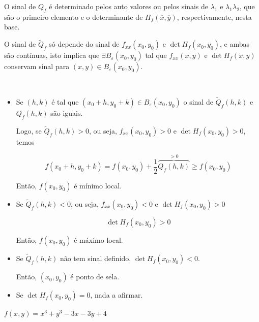 \documentclass[11pt, oneside, a4paper]{gsm-l}
\begin{document}
O sinal de $Q_f$ é determinado pelos auto valores ou pelos sinais de $\lambda_1$ e $\lambda_1\lambda_2$, que são o primeiro elemento e o determinante de $H_f \left( {\overline x ,\overline y } \right)$, respectivamente, nesta base.

O sinal de $\widetilde Q_f$ s\'o depende do sinal de $f_{xx} \left( {x_0 ,y_0 } \right)$ e $\det H_f \left( {x_0 ,y_0 } \right)$, e ambas são contínuas, isto implica que $\exists B_\varepsilon  \left( {x_0 ,y_0 } \right)$ tal que $f_{xx} \left( {x,y} \right)$ e $\det H_f \left( {x,y} \right)$ conservam sinal para $\left( {x,y} \right) \in B_\varepsilon  \left( {x_0 ,y_0 } \right)$.

\

\begin{itemize}
  \item Se $\left( {h,k} \right)$ é tal que $\left( {x_0  + h,y_0  + k} \right) \in B_\varepsilon  \left( {x_0 ,y_0 } \right)$ o sinal de $\widetilde Q_f \left( {h,k} \right)$ e $Q_f \left( {h,k} \right)$ são iguais.

      Logo, se $\widetilde Q_f \left( {h,k} \right) > 0$, ou seja, $f_{xx} \left( {x_0 ,y_0 } \right) > 0$ e $\det H_f \left( {x_0 ,y_0 } \right) > 0$, temos

\[
        f\left( {x_0  + h,y_0  + k} \right) = f\left( {x_0 ,y_0 } \right) + \frac{1}{2}\overbrace {Q_f \left( {h,k} \right)}^{ > 0} \geqslant f\left( {x_0 ,y_0 } \right)
\]

Então, $f\left( {x_0 ,y_0 } \right)$ é mínimo local.

  \item Se $\widetilde Q_f \left( {h,k} \right) < 0$, ou seja, $f_{xx} \left( {x_0 ,y_0 } \right) < 0$ e $\det H_f \left( {x_0 ,y_0 } \right) > 0$

\[
\det H_f \left( {x_0 ,y_0 } \right) > 0
\]

Então, $f\left( {x_0 ,y_0 } \right)$ é máximo local.

  \item Se $\widetilde Q_f \left( {h,k} \right)$ não tem sinal definido, $\det H_f \left( {x_0 ,y_0 } \right) < 0$.

Então, $\left( {x_0 ,y_0 } \right)$ é ponto de sela.
\item Se $\det H_f \left( {x_0 ,y_0 } \right) = 0$, nada a afirmar.
\end{itemize}

\begin{exem}
$f\left( {x,y} \right) = x^3  + y^3  - 3x - 3y + 4$
\end{exem}
\end{document}
